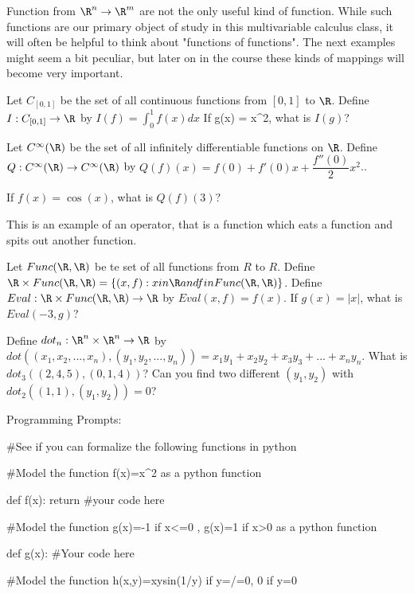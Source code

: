 Function from $\R^n \to \R^m$ are not the only useful kind of function.  While such functions are our primary object of study in 
this multivariable calculus class,  it will often be helpful to think about "functions of functions".  The next examples might seem a 
bit peculiar, but later on in the course these kinds of mappings will become very important.

\begin{question}
Let $C_{[0,1]}$ be the set of all continuous functions from $[0,1]$ to $\R$.  Define $I:C_{[0,1]} \to \R$ by $I(f) = \displaystyle \int_0^1 f(x)dx$ 
If g(x)  = x^2, what is $I(g)$?
\end{question}

\begin{question}
Let $C^{\infty}(\R)$ be the set of all infinitely differentiable functions on $\R$.  Define $Q: C^{\infty}(\R) \to C^{\infty}(\R)$ by $Q(f)(x) = f(0)+f'(0)x+\dfrac{f''(0)}{2}x^2$..

If $f(x) = \cos(x)$, what is $Q(f)(3)$?

This is an example of an operator, that is a function which eats a function and spits out another function.
\end{question}

\begin{question}
Let $Func(\R,\R)$ be te set of all functions from $R$ to $R$. Define $\R \times Func(\R,\R) = \{(x,f): x in \R and f in Func(\R,\R)\}$.  Define $Eval: \R \times Func(\R,\R) \to \R$ by $Eval(x,f) = f(x)$.
If $g(x) = |x|$, what is $Eval(-3,g)$?
\end{question}

\begin{question}
Define $dot_n:\R^n \times \R^n \to \R$ by $dot((x_1,x_2,...,x_n),(y_1,y_2,...,y_n))=x_1y_1+x_2y_2+x_3y_3+...+x_ny_n$.  What is $dot_3((2,4,5),(0,1,4))$?
Can you find  two different $(y_1,y_2)$ with $dot_2((1,1),(y_1,y_2))=0$?
\end{question}

Programming Prompts:

#See if you can formalize the following functions in python

#Model the function f(x)=x^2 as a python function

def f(x):
	return #your code here
	
#Model the function g(x)=-1 if x<=0 , g(x)=1 if x>0 as a python function

def g(x):
	#Your code here
	
#Model the function h(x,y)=xysin(1/y) if y=/=0, 0 if y=0

